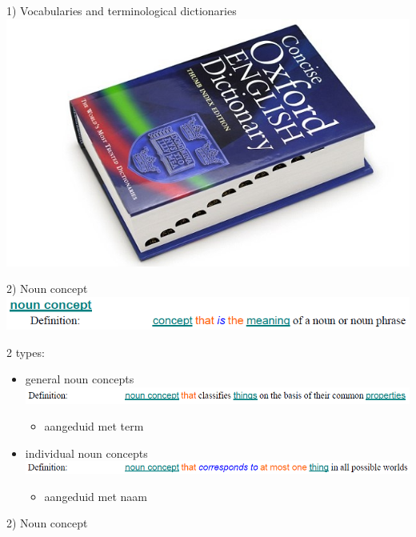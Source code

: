 \documentclass[t,12pt,english
\ifx\beamermode\undefined\else,\beamermode\fi
]{beamer}
\begin{document}
\begin{frame}{1) Vocabularies and terminological dictionaries}
	\includegraphics[width=\linewidth]{assets/dictionary}
\end{frame}

\begin{frame}{2) Noun concept}
	\includegraphics[width=\linewidth]{assets/nounConcept}
	\newline
	
	2 types:
	\begin{itemize}
		\item general noun concepts
		\includegraphics[width=\linewidth]{assets/generalNounConcept}
		\begin{itemize}
			\item aangeduid met term
		\end{itemize}
		\vspace*{0.5cm}
		\item individual noun concepts
		\includegraphics[width=\linewidth]{assets/individualNounConcept}
		\begin{itemize}
			\item aangeduid met naam
		\end{itemize}
	\end{itemize}
\end{frame}

\begin{frame}{2) Noun concept}
	\begin{example}
		
	\end{example}
\end{frame}
\end{document}
